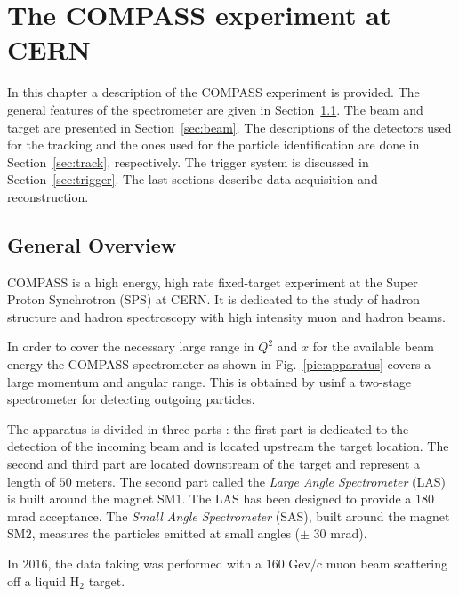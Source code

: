 
\chapter{The COMPASS experiment at CERN} %

\label{ch:exp} %

In this chapter a description of the COMPASS experiment is provided. The general features of the spectrometer are given in Section~\ref{sec:specgen}. The beam and target are presented in Section~\ref{sec:beam}. The descriptions of the detectors used for the tracking and the ones used for the particle identification are done in Section~\ref{sec:track}, respectively. The trigger system is discussed in Section~\ref{sec:trigger}. The last sections describe data acquisition and reconstruction.


\section{General Overview}\label{sec:specgen}

COMPASS is a high energy, high rate fixed-target experiment at the Super Proton Synchrotron (SPS) at CERN. It is dedicated to the study of hadron structure and hadron spectroscopy with high intensity muon and hadron beams.

In order to cover the necessary large range in $Q^2$ and $x$ for the available beam energy the COMPASS spectrometer as shown in Fig.~\ref{pic:apparatus} covers a large momentum and angular range. This is obtained by usinf a two-stage spectrometer for detecting outgoing particles.

The apparatus is divided in three parts : the first part is dedicated to the detection of the incoming beam and is located upstream the target location. The second and third part are located downstream of the target and represent a length of $50$ meters. The second part called the \textit{Large Angle Spectrometer} (LAS) is built around the magnet SM$1$. The LAS has been designed to provide a $180$ mrad acceptance. The \textit{Small Angle Spectrometer} (SAS), built around the magnet SM$2$, measures the particles emitted at small angles ($\pm$ $30$ mrad).

In $2016$, the data taking was performed with a $160$ Gev/c muon beam scattering off a liquid H$_2$ target.

